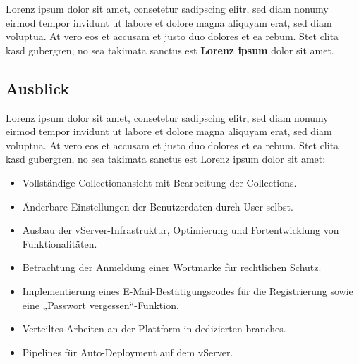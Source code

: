 Lorenz ipsum dolor sit amet, consetetur sadipscing elitr, sed diam nonumy eirmod tempor invidunt ut labore et dolore magna aliquyam erat, sed diam voluptua.
At vero eos et accusam et justo duo dolores et ea rebum.
Stet clita kasd gubergren, no sea takimata sanctus est \textbf{Lorenz ipsum} dolor sit amet.

\subsection{Ausblick}\label{subsec:ausblick-zukuenftige-ziele-und-funktionen}

Lorenz ipsum dolor sit amet, consetetur sadipscing elitr, sed diam nonumy eirmod tempor invidunt ut labore et dolore magna aliquyam erat, sed diam voluptua.
At vero eos et accusam et justo duo dolores et ea rebum.
Stet clita kasd gubergren, no sea takimata sanctus est Lorenz ipsum dolor sit amet:

\begin{itemize}[noitemsep]
    \item Vollständige Collectionansicht mit Bearbeitung der Collections.
    \item Änderbare Einstellungen der Benutzerdaten durch User selbst.
    \item Ausbau der vServer-Infrastruktur, Optimierung und Fortentwicklung von Funktionalitäten.
    \item Betrachtung der Anmeldung einer Wortmarke für rechtlichen Schutz.
    \item Implementierung eines E-Mail-Bestätigungscodes für die Registrierung sowie eine „Passwort vergessen“-Funktion.
    \item Verteiltes Arbeiten an der Plattform in dedizierten branches.
    \item Pipelines für Auto-Deployment auf dem vServer.
\end{itemize}


